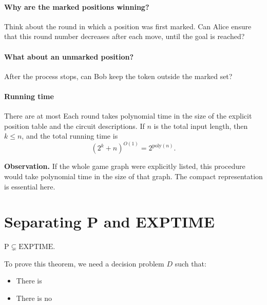 \documentclass[11  pt]{article}
\begin{document}
\paragraph{Why are the marked positions winning?}
Think about the round in which a position was first marked. Can Alice ensure that this round number decreases after each move, until the goal is reached?
\vs{1cm}

\paragraph{What about an unmarked position?}
After the process stops, can Bob keep the token outside the marked set?
\vs{1cm}

\paragraph{Running time}
There are at most  Each round takes polynomial time in the size of the explicit position table and the circuit descriptions. If $n$ is the total input length, then $k\leq n$, and the total running time is
\begin{equation*}
    (2^k+n)^{O(1)}=2^{\mathrm{poly}(n)}.
\end{equation*}

\vfill
\textbf{Observation.} If the whole game graph were explicitly listed, this procedure would take polynomial time in the size of that graph. The compact representation is essential here.

\newpage
\section{Separating P and EXPTIME}
\begin{theorem}
    $\mathrm{P}\subsetneq\mathrm{EXPTIME}$.
\end{theorem}

To prove this theorem, we need a decision problem $D$ such that:
\begin{itemize}
    \item There is 
    \item There is no 
\end{itemize}
\end{document}

